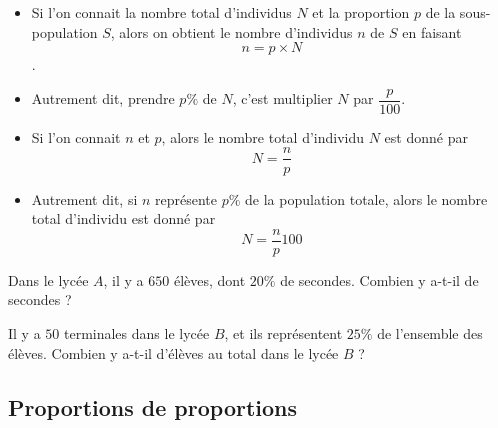 \documentclass{article}
\begin{document}
\begin{remark}
\hfill
\begin{itemize}
\item Si l'on connait la nombre total d'individus $N$ et la proportion $p$ de la sous-population $S$, alors on obtient le nombre d'individus $n$ de $S$ en faisant
\begin{equation*}
n = p \times N
\end{equation*}.
\item Autrement dit, prendre $p \%$ de $N$, c'est multiplier $N$ par $\dfrac{p}{100}$.
\item Si l'on connait $n$ et $p$, alors le nombre total d'individu $N$ est donné par
\begin{equation*}
N = \dfrac{n}{p}
\end{equation*}
\item Autrement dit, si $n$ représente $p \%$ de la population totale, alors le nombre total d'individu est donné par
\begin{equation*}
N = \dfrac{n}{p}100
\end{equation*}
\end{itemize}
\end{remark}
\begin{example}
\hfill
\begin{enumquestions}
\item Dans le lycée $A$, il y a $650$ élèves, dont $20\%$ de secondes. Combien y a-t-il de secondes ?
\item Il y a $50$ terminales dans le lycée $B$, et ils représentent $25\%$  de l'ensemble des élèves. Combien y a-t-il d'élèves au total dans le lycée $B$ ?
\end{enumquestions}

\emptybox{4cm}
\end{example}

\newpage
\subsection{Proportions de proportions}
\end{document}
